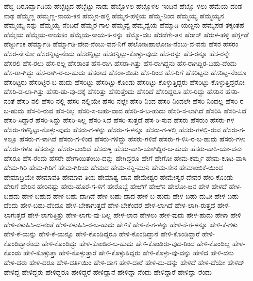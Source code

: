 ಹೆಬ್ಬಿ-ದಿರೂರ್ವ್ವಾಡಿಯ
ಹೆಬ್ಬೆಟ್ಟದ
ಹೆಬ್ಬೆಟ್ಟು-ನಾಡು
ಹೆಬ್ಬೊಳಲ
ಹೆಬ್ಬೊಳಲ-ಇಂದಿನ
ಹೆಬ್ಬೊ-ಳಲು
ಹೆಮೆಯ-ದಂಡ-ನಾಥ
ಹೆಮ್ಮಣ್ಣ
ಹೆಮ್ಮಣ್ಣ-ನಾಯ-ಕನ
ಹೆಮ್ಮನ-ಹಳ್ಳಿ
ಹೆಮ್ಮನ-ಹಳ್ಳಿಯ
ಹೆಮ್ಮ-ನಿಂದ
ಹೆಮ್ಮಯ್ಯ
ಹೆಮ್ಮಯ್ಯನ
ಹೆಮ್ಮಯ್ಯ-ನನ್ನು
ಹೆಮ್ಮಯ್ಯ-ನೆಂದಿದೆ
ಹೆಮ್ಮರ-ಗಾಲ
ಹೆಮ್ಮವ್ವೆ
ಹೆಮ್ಮವ್ವೆಯ
ಹೆಮ್ಮಾಡಿ-ಯಣ್ಣನು
ಹೆಮ್ಮೆಪಡ-ತಕ್ಕಂತಹ
ಹೆಮ್ಮೆಯ
ಹೆಮ್ಮೆಯ-ನಾಯಕಂ
ಹೆಮ್ಮೆಯ-ನಾಯ-ಕ-ನನ್ನು
ಹೆಮ್ಮೊ-ದಲ
ಹೆರಡೆಗೇ-ತನ
ಹೆರಾಸ್
ಹೆರುಳ-ಹಳ್ಳಿ
ಹೆರ್ಗ್ಗಡೆ
ಹೆರ್ಜ್ಜುಂಕ
ಹೆರ್ಮ್ಮಾಡಿ
ಹೆರ್ಮ್ಮಾಡಿ-ದೇವ-ನೆಂಬು-ವವ-ನಿಗೆ
ಹೆಲೋಜಹಾಲೋಜ-ನೆಂಬು-ವ-ವನು
ಹೆಸರ
ಹೆಸರಂ
ಹೆಸರ-ನೇನೋ
ಹೆಸರನ್ನಿಟ್ಟ-ನೆಂದು
ಹೆಸರನ್ನಿಟ್ಟು
ಹೆಸರನ್ನಿಟ್ಟು-ಕೊಳ್ಳು-ವುದು
ಹೆಸ-ರನ್ನು
ಹೆಸ-ರನ್ನೂ
ಹೆಸ-ರನ್ನೇ
ಹೆಸರಲಿ
ಹೆಸ-ರಲು
ಹೆಸ-ರಲ್ಲ
ಹೆಸರಾಂತ
ಹೆಸ-ರಾಗಿ
ಹೆಸರಾ-ಗಿತ್ತು
ಹೆಸ-ರಾಗಿದ್ದನು
ಹೆಸ-ರಾಗಿದ್ದಿರ-ಬಹು-ದೆಂದು
ಹೆಸ-ರಾ-ಗಿದ್ದು
ಹೆಸ-ರಾಗಿ-ರ-ಬ-ಹುದು
ಹೆಸರಾದ
ಹೆಸರಾ-ಯಿತು
ಹೆಸ-ರಿಂದ
ಹೆಸ-ರಿಗೆ
ಹೆಸರಿಟ್ಟನು
ಹೆಸರಿಟ್ಟ-ನೆಂದೂ
ಹೆಸರಿಟ್ಟರು
ಹೆಸರಿಟ್ಟಿರ-ಬ-ಹುದು
ಹೆಸರಿಟ್ಟು
ಹೆಸರಿಟ್ಟು-ಕೊಂಡು
ಹೆಸರಿಟ್ಟು-ಕೊಳ್ಳುತ್ತಿದ್ದರು
ಹೆಸರಿಟ್ಟು-ಕೊಳ್ಳುತ್ತಿದ್ದರೋ
ಹೆಸರಿ-ಡ-ಲಾ-ಗಿತ್ತು
ಹೆಸರಿ-ಡು-ವು-ದಕ್ಕೆ
ಹೆಸರಿತ್ತು
ಹೆಸರಿತ್ತೆಂದು
ಹೆಸರಿದೆ
ಹೆಸರಿದ್ದರೂ
ಹೆಸ-ರಿದ್ದು
ಹೆಸರಿನ
ಹೆಸರಿ-ನಂತೆ
ಹೆಸರಿ-ನಲಿ
ಹೆಸರಿ-ನಲ್ಲಿ
ಹೆಸರಿ-ನಲ್ಲಿಯೇ
ಹೆಸರಿ-ನಲ್ಲೇ
ಹೆಸರಿ-ನಿಂದ
ಹೆಸರಿ-ನಿಂದಲೇ
ಹೆಸರಿ-ನಿಂದಲ್ಲ
ಹೆಸರಿ-ರ-ಬ-ಹುದು
ಹೆಸ-ರಿ-ರುವ
ಹೆಸ-ರಿಲ್ಲ
ಹೆಸರಿ-ಸ-ಬಹು-ದಾದ
ಹೆಸರಿ-ಸ-ಬ-ಹುದು
ಹೆಸರಿ-ಸ-ಲಾಗಿದೆ
ಹೆಸರಿಸಿ
ಹೆಸರಿ-ಸಿದೆ
ಹೆಸರಿ-ಸಿದ್ದಾರೆ
ಹೆಸರಿ-ಸಿದ್ದು
ಹೆಸರಿ-ಸಿಲ್ಲ
ಹೆಸರಿ-ಸಿವೆ
ಹೆಸರಿ-ಸುತ್ತದೆ
ಹೆಸ-ರಿ-ಸುವ
ಹೆಸರು
ಹೆಸರುಂ
ಹೆಸರು-ಗಳ
ಹೆಸರು-ಗಳನ್ನಿಟ್ಟು-ಕೊಳ್ಳು-ವುದು
ಹೆಸರು-ಗ-ಳನ್ನು
ಹೆಸರು-ಗ-ಳನ್ನೂ
ಹೆಸರು-ಗ-ಳಲ್ಲಿ
ಹೆಸರು-ಗಳಲ್ಲಿ-ರುವ
ಹೆಸರು-ಗ-ಳಲ್ಲೂ
ಹೆಸರು-ಗ-ಳಾಗಿವೆ
ಹೆಸರು-ಗ-ಳಿಂದ
ಹೆಸರು-ಗಳಿದ್ದು
ಹೆಸರು-ಗಳಿವೆ
ಹೆಸರು-ಗ-ಳಿಸಿ-ರ-ಬ-ಹುದು
ಹೆಸರು-ಗಳು
ಹೆಸರು-ಗಳೂ
ಹೆಸರುನ್ನು
ಹೆಸರು-ಬಂದಿದೆ
ಹೆಸರುಳ್ಳ
ಹೆಸರು-ವಾಸಿ-ಯಾಗಿದ್ದಿರ-ಬ-ಹುದು
ಹೆಸರು-ವಾಸಿ-ಯಾ-ದನು
ಹೆಸರೂ
ಹೆಸ-ರೆಂದು
ಹೆಸರೇ
ಹೇಗಾಯಿತೆಂಬು-ದನ್ನು
ಹೇಗಿದ್ದರೂ
ಹೇಗೆ
ಹೇಗೋ
ಹೇಮ-ಕರ್ಮ್ಮ
ಹೇಮ-ಕೂಟ-ವಾಸಿ
ಹೇಮ-ಗಿರಿ
ಹೇಮ-ಗಿರಿಗೆ
ಹೇಮ-ಗಿರಿಯ
ಹೇಮದ
ಹೇಮ-ನನ್ದಿ-ಮುನಿ
ಹೇಮ-ಸೇನ
ಹೇಮಾಂಬಿಕೆ-ಯಿಂದ
ಹೇಮಾದ್ರಿಯೇ
ಹೇಮಾವತಿ
ಹೇಮಾವ-ತಿಯ
ಹೇಮಾಶ್ವ-ದಾನ
ಹೇಮೇಶ್ವರ
ಹೇಮೇಸ್ವರ-ದೇವರ
ಹೇರಿ-ಕೊಂಡು
ಹೇರಿಗೆ
ಹೇರಿನ
ಹೇರಿನಷ್ಟು
ಹೇರು-ಹೊರೆ-ಗ-ಳಿಗೆ
ಹೇರೊಬ್ಬೆ
ಹೇಱಿಗೆ
ಹೇಱಿನ
ಹೇಲೋ-ಜನ
ಹೇಳ
ಹೇಳದೆ
ಹೇಳ-ಬಹದು
ಹೇಳ-ಬಹುದ
ಹೇಳ-ಬಹು-ದಾಗಿದೆ
ಹೇಳ-ಬಹು-ದಾದ
ಹೇಳ-ಬ-ಹುದು
ಹೇಳ-ಬಹು-ದುವೀ
ಹೇಳ-ಬಹು-ದೆಂದು
ಹೇಳ-ಬಹು-ದೆಂದೂ
ಹೇಳ-ಬೇಕಾಗುತ್ತದೆ
ಹೇಳ-ಬೇಕೆಂದರೆ
ಹೇಳ-ಲಾಗಿದೆ
ಹೇಳ-ಲಾಗಿ-ರುತ್ತದೆ
ಹೇಳ-ಲಾಗುತ್ತದೆ
ಹೇಳ-ಲಾಗುತ್ತಿತ್ತು
ಹೇಳ-ಲಾಗು-ವು-ದಿಲ್ಲ
ಹೇಳ-ಲಾದ
ಹೇಳಲು
ಹೇಳ-ವುದು
ಹೇಳ-ಹುದು
ಹೇಳಾ
ಹೇಳಿ
ಹೇಳಿ-ಕಳುಹಿಸಿ-ದ-ನಂತೆ
ಹೇಳಿ-ಕಳುಹಿಸಿ-ರ-ಬ-ಹುದು
ಹೇಳಿಕೆ
ಹೇಳಿ-ಕೆ-ಗ-ಳನ್ನು
ಹೇಳಿ-ಕೆ-ಗ-ಳನ್ನೂ
ಹೇಳಿ-ಕೆ-ಗಳು
ಹೇಳಿ-ಕೆ-ಯನ್ನು
ಹೇಳಿ-ಕೆ-ಯನ್ನೂ
ಹೇಳಿ-ಕೊಂಡಿದ್ದರೂ
ಹೇಳಿ-ಕೊಂಡಿದ್ದಾನೆ
ಹೇಳಿ-ಕೊಂಡಿದ್ದಾರೆ
ಹೇಳಿ-ಕೊಂಡಿದ್ದಾರೆಂದು
ಹೇಳಿ-ಕೊಂಡಿದ್ದು
ಹೇಳಿ-ಕೊಂಡಿರ-ಬ-ಹುದು
ಹೇಳಿ-ಕೊಂಡಿರು-ವುದ-ರಿಂದ
ಹೇಳಿ-ಕೊಂಡಿಲ್ಲ
ಹೇಳಿ-ಕೊಂಡು
ಹೇಳಿ-ಕೊಳ್ಳುತ್ತಾ
ಹೇಳಿ-ಕೊಳ್ಳುತ್ತಾರೆ
ಹೇಳಿ-ಕೊಳ್ಳುತ್ತಿದ್ದರು
ಹೇಳಿ-ಕೊಳ್ಳು-ವು-ದನ್ನು
ಹೇಳಿದ
ಹೇಳಿ-ದನು
ಹೇಳಿ-ದರು
ಹೇಳಿ-ದರೂ
ಹೇಳಿ-ದರ್ತಿಯಿಂ
ಹೇಳಿ-ದಾಗ
ಹೇಳಿ-ದಾರೆ
ಹೇಳಿ-ದು-ದನ್ನು
ಹೇಳಿದೆ
ಹೇಳಿ-ದೆಯೇ
ಹೇಳಿದ್
ಹೇಳಿದ್ದ
ಹೇಳಿದ್ದರು
ಹೇಳಿದ್ದರೂ
ಹೇಳಿದ್ದರೆ
ಹೇಳಿದ್ದಾನೆ
ಹೇಳಿದ್ದಾ-ನೆಂದು
ಹೇಳಿದ್ದಾರೆ
ಹೇಳಿದ್ದಾ-ರೆಂದು
